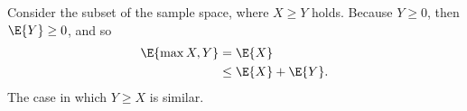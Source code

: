 Consider the subset of the sample space, where $X\ge Y$ holds.
Because $Y\ge0$, then $\E{Y}\ge0$, and so
\begin{align*}
    \E{\max{X,Y}} &= \E{X} \\
    &\le \E{X}+\E{Y}.
\end{align*}
The case in which $Y\ge X$ is similar.

